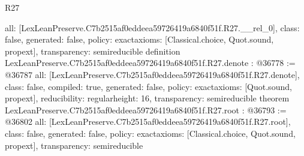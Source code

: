 \begin{lexlean}{R27}
\begin{coremodule}
{  all: [LexLeanPreserve.C7b2515af0eddeea59726419a6840f51f.R27.__rel_0],
  class: false,
  generated: false,
  policy: exact{axioms: [Classical.choice, Quot.sound, propext]},
  transparency: semireducible
}
definition LexLeanPreserve.C7b2515af0eddeea59726419a6840f51f.R27.denote : @36778 := @36787 {
  all: [LexLeanPreserve.C7b2515af0eddeea59726419a6840f51f.R27.denote],
  class: false,
  compiled: true,
  generated: false,
  policy: exact{axioms: [Quot.sound, propext]},
  reducibility: regular{height: 16},
  transparency: semireducible
}
theorem LexLeanPreserve.C7b2515af0eddeea59726419a6840f51f.R27.root : @36793 := @36802 {
  all: [LexLeanPreserve.C7b2515af0eddeea59726419a6840f51f.R27.root],
  class: false,
  generated: false,
  policy: exact{axioms: [Classical.choice, Quot.sound, propext]},
  transparency: semireducible
}


\end{coremodule}
\end{lexlean}
